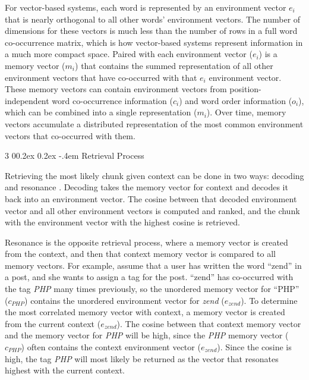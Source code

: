\documentclass[man,floatsintext,donotrepeattitle]{apa6}
\makeatletter
\renewcommand{\subsubsection}{%
  \@startsection
  {subsubsection}%
  {3}%
  {\parindent}%
  {0\baselineskip \@plus 0.2ex \@minus 0.2ex}%
  {-.4em}%
  {\normalfont\normalsize\bfseries\addperi}}
\makeatother
\begin{document}
For vector-based systems, each word is represented by an environment vector $e_{i}$ that is nearly orthogonal to all other words' environment vectors.
The number of dimensions for these vectors is much less than the number of rows in a full word co-occurrence matrix, which is how vector-based systems represent information in a much more compact space.
Paired with each environment vector ($e_{i}$) is a memory vector ($m_{i}$) that contains the summed representation of all other environment vectors that have co-occurred with that $e_{i}$ environment vector.
These memory vectors can contain environment vectors from position-independent word co-occurrence information ($c_{i}$) and word order information ($o_{i}$), which can be combined into a single representation ($m_{i}$).
Over time, memory vectors accumulate a distributed representation of the most common environment vectors that co-occurred with them.

\subsubsection{Retrieval Process}

Retrieving the most likely chunk given context can be done in two ways: decoding and resonance \parencite{Jones2007}.
Decoding takes the memory vector for context and decodes it back into an environment vector.
The cosine between that decoded environment vector and all other environment vectors is computed and ranked, and the chunk with the environment vector with the highest cosine is retrieved.

Resonance is the opposite retrieval process, where a memory vector is created from the context, and then that context memory vector is compared to all memory vectors.
For example, assume that a user has written the word ``zend'' in a post, and she wants to assign a tag for the post.
``zend'' has co-occurred with the tag \emph{PHP} many times previously, so the unordered memory vector for ``PHP'' ($c_{\mathit{PHP}}$) contains the unordered environment vector for \emph{zend} ($e_{zend}$).
To determine the most correlated memory vector with context, a memory vector is created from the current context ($e_{zend}$).
The cosine between that context memory vector and the memory vector for \emph{PHP} will be high, since the \emph{PHP} memory vector ($c_{\mathit{PHP}}$) often contains the context environment vector ($e_{zend}$).
Since the cosine is high, the tag \emph{PHP} will most likely be returned as the vector that resonates highest with the current context.
\end{document}
